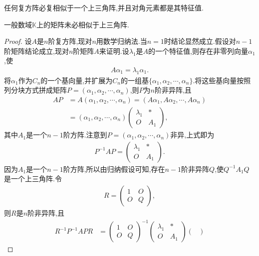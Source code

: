 \documentclass[../../main.tex]{subfiles}
\begin{document}
\begin{theorem}[复方阵必相似于上三角阵]\label{theorem:复方阵必相似于上三角阵}
任何复方阵必复相似于一个上三角阵,并且对角元素都是其特征值.
\end{theorem}
\begin{remark}
一般数域$\mathbb{K}$上的矩阵未必相似于上三角阵.
\end{remark}
\begin{proof}
设$A$是$n$阶复方阵,现对$n$用数学归纳法.当$n=1$时结论显然成立.假设对$n-1$阶矩阵结论成立,现对$n$阶矩阵$A$来证明.设$\lambda_1$是$A$的一个特征值,则存在非零列向量$\alpha_1$,使
\begin{align*}
A \alpha_1 = \lambda_1 \alpha_1.
\end{align*}
将$\alpha_1$作为$C_n$的一个基向量,并扩展为$C_n$的一组基$\{\alpha_1, \alpha_2, \cdots, \alpha_n\}$.将这些基向量按照列分块方式拼成矩阵$P = (\alpha_1, \alpha_2, \cdots, \alpha_n)$,则$P$为$n$阶非异阵,且
\begin{align*}
AP &= A(\alpha_1, \alpha_2, \cdots, \alpha_n) = (A\alpha_1, A\alpha_2, \cdots, A\alpha_n) \\
&= (\alpha_1, \alpha_2, \cdots, \alpha_n) \begin{pmatrix}
\lambda_1 & * \\
O & A_1
\end{pmatrix},
\end{align*}
其中$A_1$是一个$n-1$阶方阵.注意到$P = (\alpha_1, \alpha_2, \cdots, \alpha_n)$非异,上式即为
\begin{align*}
P^{-1}AP = \begin{pmatrix}
\lambda_1 & * \\
O & A_1
\end{pmatrix}.
\end{align*}
因为$A_1$是一个$n-1$阶方阵,所以由归纳假设可知,存在$n-1$阶非异阵$Q$,使$Q^{-1}A_1Q$是一个上三角阵.令
\begin{align*}
R = \begin{pmatrix}
1 & O \\
O & Q
\end{pmatrix},
\end{align*}
则$R$是$n$阶非异阵,且
\begin{align*}
R^{-1}P^{-1}APR &= \begin{pmatrix}
1 & O \\
O & Q
\end{pmatrix}^{-1} \begin{pmatrix}
\lambda_1 & * \\
O & A_1
\end{pmatrix} \begin{pmatrix}

\end{pmatrix}
\end{align*}
\end{proof}
\end{document}
